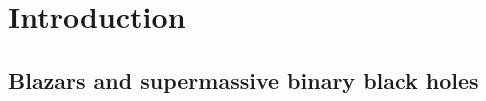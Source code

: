 \documentclass[preprints,article,accept,moreauthors,pdftex]{Definitions/mdpi}
\begin{document}
      


\section{Introduction}

 
\subsection{Blazars and supermassive binary black holes} 
\end{document}
